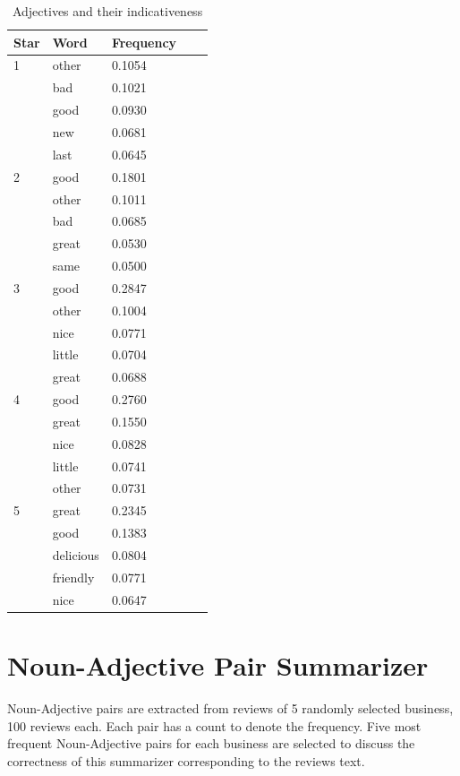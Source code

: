 \documentclass[sigconf]{acmart}
\begin{document}
\begin{table}
  \caption{Adjectives and their indicativeness}
  \label{tab:adj2}
  \begin{tabular}{lllll}
    \toprule
    Star & Word & Frequency \\
    \midrule
    1 & other & 0.1054\\ 
    & bad & 0.1021\\ 
    & good & 0.0930\\ 
    & new & 0.0681\\ 
    & last & 0.0645\\
    2 & good & 0.1801\\ 
    & other & 0.1011\\ 
    & bad & 0.0685\\ 
    & great & 0.0530\\ 
    & same & 0.0500\\
    3 & good & 0.2847\\ 
    & other & 0.1004\\ 
    & nice & 0.0771\\ 
    & little & 0.0704\\ 
    & great & 0.0688\\
    4 & good & 0.2760\\ 
    & great & 0.1550\\ 
    & nice & 0.0828\\ 
    & little & 0.0741\\ 
    & other & 0.0731\\
    5 & great & 0.2345\\ 
    & good & 0.1383\\ 
    & delicious & 0.0804\\
    & friendly & 0.0771\\ 
    & nice & 0.0647\\
\end{tabular}
\end{table}


\section{Noun-Adjective Pair Summarizer}
Noun-Adjective pairs are extracted from reviews of 5 randomly selected business, 100 reviews each. Each pair has a count to denote the frequency. Five most frequent Noun-Adjective pairs for each business are selected to discuss the correctness of this summarizer corresponding to the reviews text. 
\end{document}
